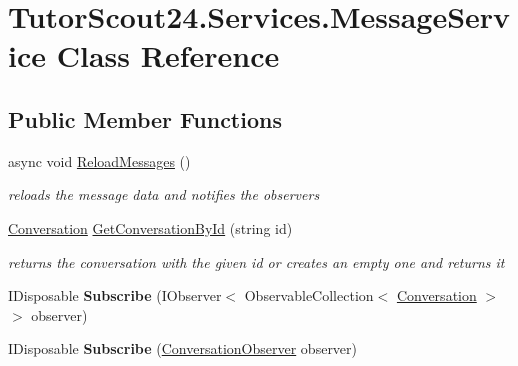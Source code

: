 \hypertarget{class_tutor_scout24_1_1_services_1_1_message_service}{}\section{Tutor\+Scout24.\+Services.\+Message\+Service Class Reference}
\label{class_tutor_scout24_1_1_services_1_1_message_service}
\subsection*{Public Member Functions}
\begin{DoxyCompactItemize}
\item 
async void \mbox{\hyperlink{class_tutor_scout24_1_1_services_1_1_message_service_a1a170ef80b97e859c90b2cd709ec4407}{Reload\+Messages}} ()
\begin{DoxyCompactList}\small\item\em reloads the message data and notifies the observers \end{DoxyCompactList}\item 
\mbox{\hyperlink{class_tutor_scout24_1_1_models_1_1_chat_1_1_conversation}{Conversation}} \mbox{\hyperlink{class_tutor_scout24_1_1_services_1_1_message_service_a85c1daee447550a3368d544643dceac6}{Get\+Conversation\+By\+Id}} (string id)
\begin{DoxyCompactList}\small\item\em returns the conversation with the given id or creates an empty one and returns it \end{DoxyCompactList}\item 
\mbox{\label{class_tutor_scout24_1_1_services_1_1_message_service_af117587ac2a4d36eef204fd9b4567a6d}} 
I\+Disposable {\bfseries Subscribe} (I\+Observer$<$ Observable\+Collection$<$ \mbox{\hyperlink{class_tutor_scout24_1_1_models_1_1_chat_1_1_conversation}{Conversation}} $>$$>$ observer)
\item 
\mbox{\label{class_tutor_scout24_1_1_services_1_1_message_service_afc352cebb6ac789d1be129448f4bd707}} 
I\+Disposable {\bfseries Subscribe} (\mbox{\hyperlink{interface_tutor_scout24_1_1_services_1_1_conversation_observer}{Conversation\+Observer}} observer)
\end{DoxyCompactItemize}
